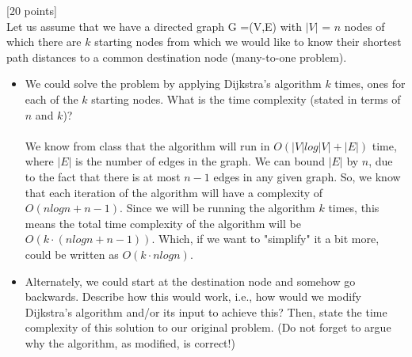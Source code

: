 \documentclass[12pt]{article}
\newcounter{ques}
\newenvironment{question}{\stepcounter{ques}{\noindent\bf Question \arabic{ques}:}}{\vspace{5mm}}
\begin{document}
\begin{question}[20 points]\\
 Let us assume that we have a directed graph G =(V,E) with $|V|$  = $n$ nodes of which there are $k$ starting nodes from which we would like to know their shortest path distances to a common destination node (many-to-one problem).

 \begin{itemize}
 	\item We could solve the problem by applying Dijkstra's algorithm $k$ times, ones for each of the $k$ starting nodes. What is the time  complexity (stated in terms of $n$ and $k$)?\\\\

  We know from class that the algorithm will run in $O(|V|log|V|+|E|)$ time, where $|E|$ is the number of edges in the graph. We can bound $|E|$ by $n$, due to the fact that there is at most $n-1$ edges in any given graph. So, we know that each iteration of the algorithm will have a complexity of $O(nlogn+n-1)$. Since we will be running the algorithm $k$ times, this means the total time complexity of the algorithm will be $O(k\cdot(nlogn+n-1))$. Which, if we want to "simplify" it a bit more, could be written as $O(k\cdot nlogn)$.


 	\item Alternately, we could  start at the destination node and  somehow go backwards. Describe how this would work, i.e., how would we modify Dijkstra's algorithm and/or its input to achieve this?  Then, state the time complexity of this solution to our original problem. (Do not forget to argue why the algorithm, as modified, is correct!)\\\\


\end{itemize}
\end{question}
\end{document}
